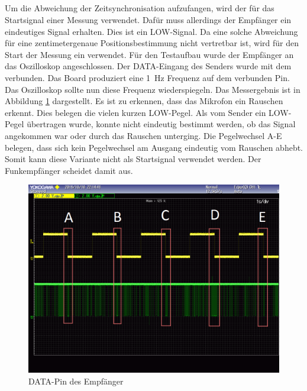 \subsection{\funkempfaenger}
Um die Abweichung der Zeitsynchronisation aufzufangen, wird der \funkempfaenger \platz für das Startsignal einer Messung verwendet. Dafür muss allerdings der Empfänger ein eindeutiges Signal erhalten. Dies ist ein \si{LOW}-Signal. Da eine solche Abweichung für eine zentimetergenaue Positionsbestimmung nicht vertretbar ist, wird für den Start der Messung ein \funkempfaenger \platz verwendet. Für den Testaufbau wurde der Empfänger an das Oszilloskop angeschlossen. Der \si{DATA}-Eingang des Senders wurde mit dem \board \platz verbunden. Das Board produziert eine \SI{1}{\hertz} Frequenz auf dem verbunden Pin. Das Oszilloskop sollte nun diese Frequenz wiederspiegeln. Das Messergebnis ist in Abbildung \ref{img:ausgang_sender_pin} dargestellt. Es ist zu erkennen, dass das Mikrofon ein Rauschen erkennt. Dies belegen die vielen kurzen \si{LOW}-Pegel. Als vom Sender ein \si{LOW}-Pegel übertragen wurde, konnte nicht eindeutig bestimmt werden, ob das Signal angekommen war oder durch das Rauschen unterging. Die Pegelwechsel A-E belegen, dass sich kein Pegelwechsel am Ausgang eindeutig vom Rauschen abhebt. Somit kann diese Variante nicht als Startsignal verwendet werden. Der Funkempfänger scheidet damit aus.

\begin{figure}[H]
        \centering
        \hspace*{-1.7cm}
        \includegraphics[width=1.2\textwidth]{images/schmitt_trigger_billig_sender_bearbeitet.png}
        \caption{\si{DATA}-Pin des \funkempfaenger \platz Empfänger}    
        \label{img:ausgang_sender_pin}
\end{figure}

